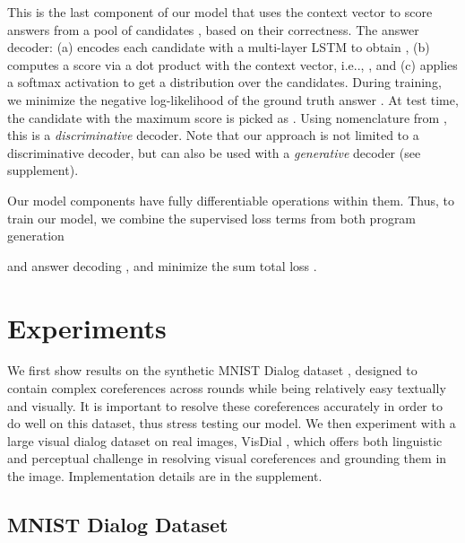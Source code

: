 \documentclass[runningheads]{llncs}
\makeatletter
\DeclareRobustCommand\onedot{\futurelet\@let@token\@onedot}
\def\@onedot{\ifx\@let@token.\else.\null\fi\xspace}
\def\ie{i.e\onedot} \def\Ie{I.e\onedot}
\newcommand{\myparagraph}[1]{\vspace{0pt}\noindent{\bf #1}}
\newcommand{\addresults}[1]{}
\makeatother
\begin{document}
\myparagraph{Answer Decoding.}
\label{sec:ans_decode}
This is the last component of our model that uses the context vector  to 
score answers from a pool of candidates , based on their
correctness.
The answer decoder: 
(a) encodes each candidate  with a multi-layer LSTM
to obtain ,
(b) computes a score via a dot product with the context vector, \ie, , and
(c) applies a softmax activation to get a distribution over the candidates.
During training, we minimize the negative log-likelihood 
of the ground truth answer .
At test time, the candidate with the maximum score is picked as .
Using nomenclature from \cite{visdial}, this is a \textit{discriminative} 
decoder.
Note that our approach is not limited to a discriminative decoder, but can also 
be used with a \textit{generative} decoder (see supplement).


\myparagraph{Training Details.}
Our model components have fully differentiable operations within them.
Thus, to train our model, we combine the supervised loss terms from both
program generation 

and answer decoding , and minimize the sum total loss 
.
% 
\section{Experiments}
\addresults{We  show results on the synthetic
MNIST Dialog dataset \cite{paul2017visual} with complex coreferences across rounds and a large dialog dataset on real 
images,  VisDial \cite{visdial}.}

We first show results on the synthetic
MNIST Dialog dataset \cite{paul2017visual}, 
designed to contain complex coreferences across rounds while being relatively 
easy textually and visually.
It is important to resolve these coreferences accurately in order to do 
well on this dataset, thus stress testing our model.
We then experiment with a large visual dialog dataset on real 
images,  VisDial \cite{visdial},
which offers both
linguistic and perceptual challenge in resolving visual coreferences and
grounding them in the image.
Implementation details are in the supplement.


\subsection{MNIST Dialog Dataset}
\end{document}
